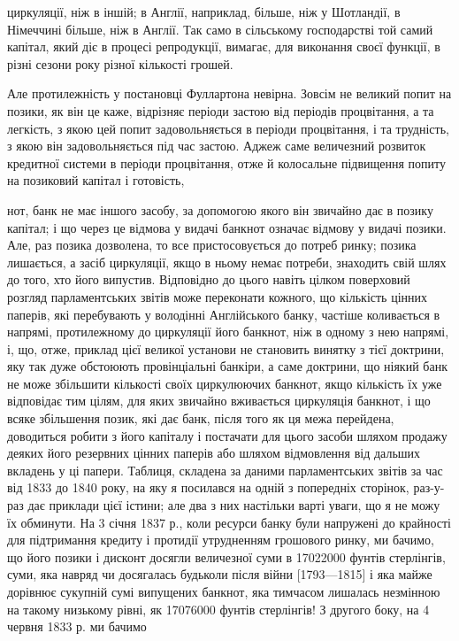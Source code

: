 циркуляції, ніж в іншій; в Англії, наприклад, більше, ніж у
Шотландії, в Німеччині більше, ніж в Англії. Так само в сільському
господарстві той самий капітал, який діє в процесі репродукції,
вимагає, для виконання своєї функції, в різні сезони
року різної кількості грошей.

Але протилежність у постановці Фуллартона невірна. Зовсім
не великий попит на позики, як він це каже, відрізняє періоди
застою від періодів процвітання, а та легкість, з якою цей попит
задовольняється в періоди процвітання, і та трудність, з якою
він задовольняється під час застою. Аджеж саме величезний
розвиток кредитної системи в періоди процвітання, отже й колосальне
підвищення попиту на позиковий капітал і готовість,

нот, банк не має іншого засобу, за допомогою якого він звичайно дає в позику
капітал; і що через це відмова у видачі банкнот означає відмову у видачі позики.
Але, раз позика дозволена, то все пристосовується до потреб ринку; позика
лишається, а засіб циркуляції, якщо в ньому немає потреби, знаходить
свій шлях до того, хто його випустив. Відповідно до цього навіть цілком поверховий
розгляд парламентських звітів може переконати кожного, що кількість
цінних паперів, які перебувають у володінні Англійського банку, частіше коливається
в напрямі, протилежному до циркуляції його банкнот, ніж в одному
з нею напрямі, і, що, отже, приклад цієї великої установи не становить винятку
з тієї доктрини, яку так дуже обстоюють провінціальні банкіри, а саме доктрини,
що ніякий банк не може збільшити кількості своїх циркулюючих банкнот,
якщо кількість їх уже відповідає тим цілям, для яких звичайно вживається циркуляція
банкнот, і що всяке збільшення позик, які дає банк, після того як ця межа
перейдена, доводиться робити з його капіталу і постачати для цього засоби
шляхом продажу деяких його резервних цінних паперів або шляхом відмовлення
від дальших вкладень у ці папери. Таблиця, складена за даними парламентських
звітів за час від 1833 до 1840 року, на яку я посилався на одній з попередніх
сторінок, раз-у-раз дає приклади цієї істини; але два з них настільки варті уваги,
що я не можу їх обминути. На 3 січня 1837 р., коли ресурси банку були
напружені до крайності для підтримання кредиту і протидії утрудненням
грошового ринку, ми бачимо, що його позики і дисконт досягли величезної
суми в 17022000 фунтів стерлінгів, суми, яка навряд чи досягалась будьколи
після війни [1793—1815] і яка майже дорівнює сукупній сумі випущених
банкнот, яка тимчасом лишалась незмінною на такому низькому рівні,
як 17076000 фунтів стерлінгів! З другого боку, на 4 червня 1833 р. ми бачимо
